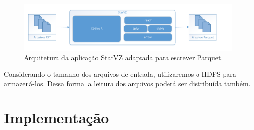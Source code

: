 \begin{figure}[ht]
 \centerline{\includegraphics[width=1\textwidth]{./img/starvz-arch-arrow.pdf}}
 \caption{Arquitetura da aplicação StarVZ adaptada para escrever Parquet.}
 \label{fig:starvz-app-arrow}
\end{figure}

Considerando o tamanho dos arquivos de entrada, utilizaremos o HDFS para armazená-los. Dessa forma, a leitura dos arquivos
poderá ser distribuída também.

\section{Implementação} \label{sect:implement}
